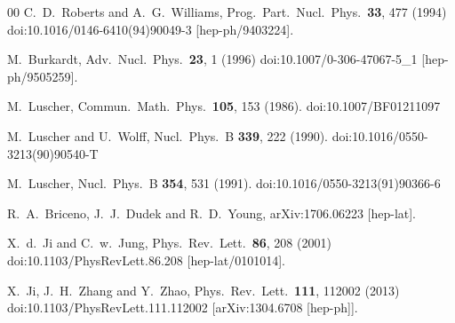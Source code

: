 \begin{thebibliography}{00}
	C.~D.~Roberts and A.~G.~Williams,
	Prog.\ Part.\ Nucl.\ Phys.\  {\bf 33}, 477 (1994)
	doi:10.1016/0146-6410(94)90049-3
	[hep-ph/9403224].


	M.~Burkardt,
	Adv.\ Nucl.\ Phys.\  {\bf 23}, 1 (1996)
	doi:10.1007/0-306-47067-5\_1
	[hep-ph/9505259].


	M.~Luscher,
	Commun.\ Math.\ Phys.\  {\bf 105}, 153 (1986).
	doi:10.1007/BF01211097


	M.~Luscher and U.~Wolff,
	Nucl.\ Phys.\ B {\bf 339}, 222 (1990).
	doi:10.1016/0550-3213(90)90540-T


	M.~Luscher,
	Nucl.\ Phys.\ B {\bf 354}, 531 (1991).
	doi:10.1016/0550-3213(91)90366-6


	R.~A.~Briceno, J.~J.~Dudek and R.~D.~Young,
	arXiv:1706.06223 [hep-lat].



	X.~d.~Ji and C.~w.~Jung,
	Phys.\ Rev.\ Lett.\  {\bf 86}, 208 (2001)
	doi:10.1103/PhysRevLett.86.208
	[hep-lat/0101014].


	X.~Ji, J.~H.~Zhang and Y.~Zhao,
	Phys.\ Rev.\ Lett.\  {\bf 111}, 112002 (2013)
	doi:10.1103/PhysRevLett.111.112002
	[arXiv:1304.6708 [hep-ph]].




\end{thebibliography}
